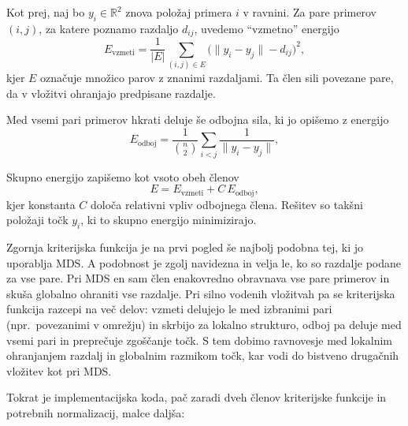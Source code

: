 Kot prej, naj bo $y_i \in \mathbb{R}^2$ znova položaj primera $i$ v ravnini. Za pare primerov $(i,j)$, za katere poznamo razdaljo $d_{ij}$, uvedemo ``vzmetno'' energijo
\[
E_{\text{vzmeti}} = \frac{1}{|E|} \sum_{(i,j)\in E} \bigl( \|y_i - y_j\| - d_{ij} \bigr)^2,
\]
kjer $E$ označuje množico parov z znanimi razdaljami. Ta člen sili povezane pare, da v vložitvi ohranjajo predpisane razdalje.

Med vsemi pari primerov hkrati deluje še odbojna sila, ki jo opišemo z energijo
\[
E_{\text{odboj}} = \frac{1}{\binom{n}{2}} \sum_{i<j} \frac{1}{\|y_i - y_j\|},
\]

Skupno energijo zapišemo kot vsoto obeh členov
\[
E = E_{\text{vzmeti}} + C \, E_{\text{odboj}},
\]
kjer konstanta \(C\) določa relativni vpliv odbojnega člena. Rešitev so takšni položaji točk $y_i$, ki to skupno energijo minimizirajo.

Zgornja kriterijska funkcija je na prvi pogled še najbolj podobna tej, ki jo uporablja MDS. A podobnost je zgolj navidezna in velja le, ko so razdalje podane za vse pare. Pri MDS en sam člen enakovredno obravnava vse pare primerov in skuša globalno ohraniti vse razdalje. Pri silno vodenih vložitvah pa se kriterijska funkcija razcepi na več delov: vzmeti delujejo le med izbranimi pari (npr.\ povezanimi v omrežju) in skrbijo za lokalno strukturo, odboj pa deluje med vsemi pari in preprečuje zgoščanje točk. S tem dobimo ravnovesje med lokalnim ohranjanjem razdalj in globalnim razmikom točk, kar vodi do bistveno drugačnih vložitev kot pri MDS.

Tokrat je implementacijska koda, pač zaradi dveh členov kriterijske funkcije in potrebnih normalizacij, malce daljša:


